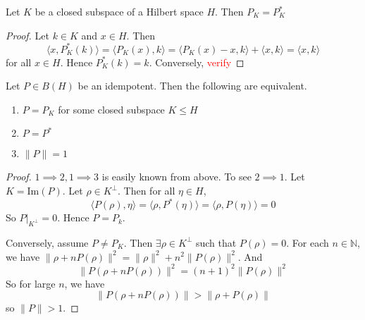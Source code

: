 \begin{proposition}
  Let $K$ be a closed subspace of a Hilbert space $H$. Then $P_K = P_K^*$
\end{proposition}
\begin{proof}
  Let $k \in K$ and $x \in H$. Then \[
    \langle x , P_K^*(k) \rangle = \langle P_K(x) , k \rangle =
    \langle  P_K(x)-x , k \rangle + \langle x , k \rangle = \langle x
    , k \rangle
  \]
  for all $x \in H$.
  Hence $P_K^*(k) = k$.
  Conversely, \textcolor{red}{verify}
\end{proof}

\begin{theorem}
  Let $P \in B(H)$ be an idempotent. Then the following are equivalent.
  \begin{enumerate}[label=(\arabic*)]
    \item $P = P_K$ for some closed subspace $K \leqslant H$
    \item $P = P^*$
    \item $\|P\| = 1$
  \end{enumerate}
\end{theorem}
\begin{proof}
  $1 \implies 2, 1 \implies 3$ is easily known from above.
  To see $2 \implies 1$. Let $K = \textrm{Im}(P)$. Let $\rho \in
  K^\perp$. Then for all $\eta \in H$, \[
    \langle P(  \rho) ,  \eta \rangle  = \langle \rho ,  P^*(\eta)
    \rangle  = \langle \rho ,  P(\eta) \rangle = 0
  \]
  So $P|_{K^\perp} = 0$. Hence $P = P_k$.

  Conversely, assume $P \neq P_K$. Then $\exists \rho \in K^\perp$
  such that $P(\rho) = 0$. For each $n \in \mathbb{N}$, we have
  $\|\rho + n P(\rho)\|^2 = \|\rho\|^2 + n^2 \|P(\rho)\|^2$. And \[
    \|P(\rho + n P(\rho))\|^2 = (n+1)^2 \|P(\rho)\|^2
  \]
  So for large $n$, we have \[
    \|P(\rho + n P(\rho))\| > \|\rho + P(\rho)\|
  \]
  so $\|P\| > 1$.
\end{proof}

